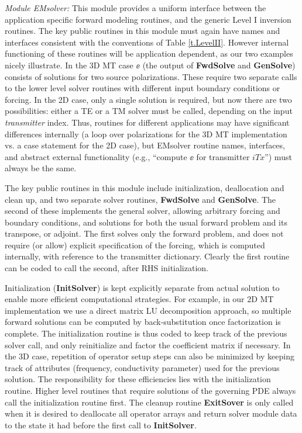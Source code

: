 \vspace{6pt}
\noindent
{\em Module EMsolver:}  This module
provides a uniform interface between the application specific forward
modeling routines, and the generic Level I inversion routines.
The key public routines in this module must again have names and
interfaces consistent with the conventions of Table \ref{t.LevelII}.
However internal functioning of these routines will be application
dependent, as our two examples nicely illustrate.  In the 3D MT case
$\ee$ (the output of {\bf FwdSolve} and {\bf GenSolve}) consists of
solutions for two source polarizations.  These require two separate
calls to the lower level solver routines with different
input boundary conditions or forcing.  In the 2D case,
only a single solution is required, but now there are two possibilities:
either a TE or a TM solver must be called, 
depending on the input {\it transmitter} index.
Thus, routines for different applications may
have significant differences internally 
(a loop over polarizations for  the 3D MT implementation 
vs. a case statement for the 2D case), 
but EMsolver routine names, interfaces, and abstract external
functionality (e.g., ``compute $\ee$ for transmitter $iTx$'')
must always be the same.

The key public routines in this module include initialization,
deallocation and clean up, and two separate solver routines, 
{\bf FwdSolve} and {\bf GenSolve}.  The second of these implements
the general solver, allowing arbitrary forcing and boundary conditions,
and solutions for both the usual forward problem and 
its transpose, or adjoint.  The first solves only
the forward problem, and does not require (or allow) explicit
specification of the forcing, which is computed 
internally, with reference to the transmitter dictionary.
Clearly the first routine can be coded to call the second, after RHS
initialization.

Initialization ({\bf InitSolver}) is kept explicitly separate from
actual solution to enable more efficient computational strategies.
For example, in our 2D MT implementation we use a direct matrix LU
decomposition approach, so multiple forward solutions can be computed
by back-substitution once factorization is complete.  The initialization
routine is thus coded to keep track of the previous solver call, and only
reinitialize and factor the coefficient matrix if necessary.  
In the 3D case, repetition of operator
setup steps can also be minimized by keeping track of attributes
(frequency, conductivity parameter) used 
for the previous solution.  The responsibility for
these efficiencies lies with the initialization
routine.  Higher level routines that require solutions 
of the governing PDE always call the initialization
routine first.  The cleanup routine {\bf ExitSover}
is only called when it is
desired to deallocate all operator arrays and 
return solver module data to the
state it had before the first call to {\bf InitSolver}.


